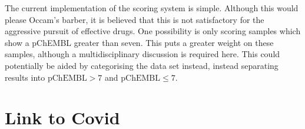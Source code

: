 The current implementation of the scoring system is simple. Although this would please Occam's barber, it is believed that this is not satisfactory for the aggressive pursuit of effective drugs. One possibility is only scoring samples which show a pChEMBL greater than seven. This puts a greater weight on these samples, although a multidisciplinary discussion is required here. This could potentially be aided by categorising the data set instead, instead separating results into $\mathrm{pChEMBL}>7$ and $\mathrm{pChEMBL}\leq{}7$.

\section{Link to Covid}
\blindtext[1]

